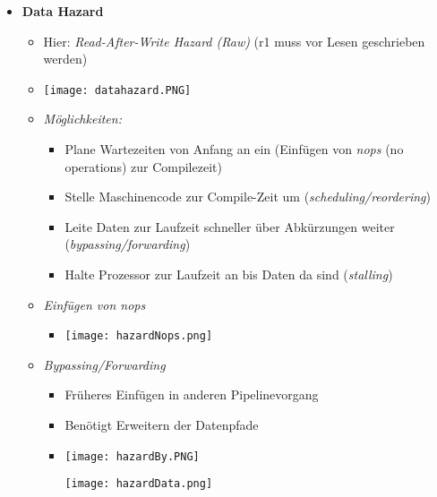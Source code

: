 \begin{itemize}
        \item \textbf{Data Hazard}
            \begin{itemize}
                \item Hier: \textit{Read-After-Write Hazard (Raw)} (r1 muss vor Lesen geschrieben werden)
                \item[] \texttt{[image: datahazard.PNG]}
                \item \textit{Möglichkeiten:}
                    \begin{itemize}
                        \item Plane Wartezeiten von Anfang an ein (Einfügen von \textit{nops} (no operations) zur Compilezeit)
                        \item Stelle Maschinencode zur Compile-Zeit um (\textit{scheduling/reordering})
                        \item Leite Daten zur Laufzeit schneller über Abkürzungen weiter (\textit{bypassing/forwarding})
                        \item Halte Prozessor zur Laufzeit an bis Daten da sind (\textit{stalling})
                    \end{itemize}
                \item \textit{Einfügen von nops}
                    \begin{itemize}
                        \item[] \texttt{[image: hazardNops.png]}
                    \end{itemize}
                \item \textit{Bypassing/Forwarding}
                    \begin{itemize}
                        \item Früheres Einfügen in anderen Pipelinevorgang
                        \item Benötigt Erweitern der Datenpfade
                        \item[]
                            \begin{minipage}{0.45\textwidth}
                                \texttt{[image: hazardBy.PNG]}
                            \end{minipage}
                            \begin{minipage}{0.45\textwidth}
                                \texttt{[image: hazardData.png]}
                            \end{minipage}
                    \end{itemize}

\end{itemize}
\end{itemize}
